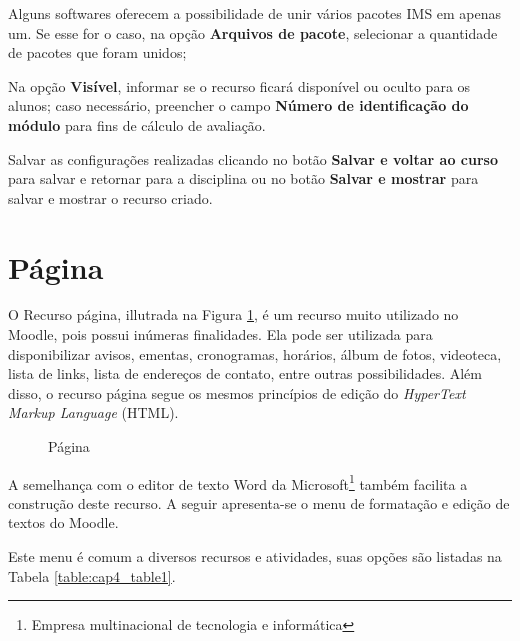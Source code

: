 Alguns softwares oferecem a possibilidade de unir vários pacotes IMS em apenas um. Se esse for o caso, na opção \textbf{Arquivos de pacote}, selecionar a quantidade de pacotes que foram unidos;

Na opção \textbf{Visível}, informar se o recurso ficará disponível ou oculto para os alunos;
caso necessário, preencher o campo \textbf{Número de identificação do módulo} para fins de cálculo de avaliação.

Salvar as configurações realizadas clicando no botão \textbf{Salvar e voltar ao curso}  para salvar e retornar para a disciplina ou no botão \textbf{Salvar e mostrar }para salvar e mostrar o recurso criado.

\section{Página}

O Recurso página, illutrada na Figura \ref{fig:cap4_1}, é um recurso muito utilizado no Moodle, pois possui inúmeras finalidades. Ela pode ser utilizada para disponibilizar avisos, ementas, cronogramas, horários, álbum de fotos, videoteca, lista de links, lista de endereços de contato, entre outras possibilidades. Além disso, o recurso página segue os mesmos princípios de edição do \textit{HyperText Markup Language }(HTML).
\begin{figure}[htbp]
 \begin{center}
  \caption{Página}
  \label{fig:cap4_1}
 \end{center}
\end{figure}
A semelhança com o editor de texto Word da Microsoft\footnote{Empresa multinacional de tecnologia e informática} também facilita a construção deste recurso. A seguir apresenta-se o menu de formatação e edição de textos do Moodle.

Este menu é comum a diversos recursos e atividades, suas opções são listadas na Tabela \ref{table:cap4_table1}.

